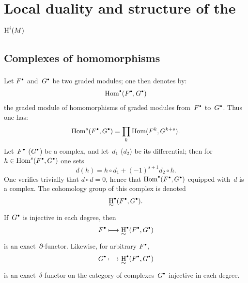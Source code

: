 \chapter{Local duality and structure of the $\operatorname{H}^i(M)$}\label{V}

\renewcommand{\theequation}{\arabic{equation}}

\section{Complexes of homomorphisms} \label{V.1}

\subsection{} \label{V.1.1}
Let $F^{\boule}$ and~$G^{\boule}$ be two graded modules; one then denotes by:
\begin{equation} \label{eq:V.1} \Hom^{\boule}(F^{\boule}, G^{\boule})
\end{equation}
the graded module of homomorphisms of graded modules from~$F^{\boule}$ to~$G^{\boule}$. Thus one has:
\begin{equation} \label{eq:V.2} \Hom^{s}(F^{\boule}, G^{\boule})=\prod_{k}\Hom(F^{k}, G^{k+s}).
\end{equation}
Let~$F^{\boule}$ (\resp $G^{\boule}$) be a complex, and let~$d_{1}$ (\resp $d_{2}$) be its differential; then for $h\in\Hom^{s}(F^{\boule}, G^{\boule})$ one sets
\begin{equation} \label{eq:V.3} d(h)=h\circ d_{1}+(-1)^{{s+1}}d_{2}\circ h.
\end{equation}
One verifies trivially that $d\circ d=0$, hence that $\Hom^{\boule}(F^{\boule}, G^{\boule})$ equipped with~$d$ is a complex. The cohomology group of this complex is denoted
\begin{equation} \label{eq:V.4} \uH^{\boule}(F^{\boule}, G^{\boule}).
\end{equation}
If~$G^{\boule}$ is injective in each degree, then
$$F^{\boule}\mto\uH^{\boule}(F^{\boule}, G^{\boule})$$
is an exact~$\partial$-functor. Likewise, for arbitrary $F^{\boule}$,
$$G^{\boule}\mto\uH^{\boule}(F^{\boule}, G^{\boule})$$
is an exact~$\delta$-functor on the category of complexes~$G^{\boule}$ injective in each degree.

